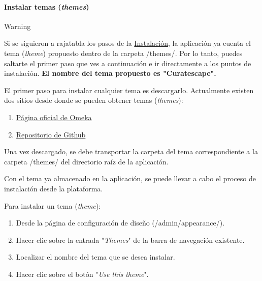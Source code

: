 \documentclass[
]{article}
\providecommand{\tightlist}{%
  \setlength{\itemsep}{0pt}\setlength{\parskip}{0pt}}
\begin{document}
\hypertarget{instalar-temas-themes}{%
\paragraph{\texorpdfstring{Instalar temas
(\emph{themes})}{Instalar temas (themes)}}\label{instalar-temas-themes}}

Warning

Si se siguieron a rajatabla los pasos de la
\protect\hyperlink{instalaciuxf3n}{Instalación}, la aplicación ya cuenta
el tema (\emph{theme}) propuesto dentro de la carpeta {/themes/}. Por lo
tanto, puedes saltarte el primer paso que ves a continuación e ir
directamente a los puntos de instalación. \textbf{El nombre del tema
propuesto es "Curatescape".}

El primer paso para instalar cualquier tema es descargarlo. Actualmente
existen dos sitios desde donde se pueden obtener temas (\emph{themes}):

\begin{enumerate}
\def\labelenumi{\arabic{enumi}.}
\tightlist
\item
  \href{https://omeka.org/classic/themes/}{Página oficial de Omeka}
\item
  \href{https://daniel-km.github.io/UpgradeToOmekaS/omeka_themes.html}{Repositorio
  de Github}
\end{enumerate}

Una vez descargado, se debe transportar la carpeta del tema
correspondiente a la carpeta {/themes/} del directorio raíz de la
aplicación.

Con el tema ya almacenado en la aplicación, se puede llevar a cabo el
proceso de instalación desde la plataforma.

Para instalar un tema (\emph{theme}):

\begin{enumerate}
\def\labelenumi{\arabic{enumi}.}
\tightlist
\item
  Desde la página de configuración de diseño ({/admin/appearance/}).
\item
  Hacer clic sobre la entrada "\emph{Themes}" de la barra de navegación
  existente.
\item
  Localizar el nombre del tema que se desea instalar.
\item
  Hacer clic sobre el botón "\emph{Use this theme}".
\end{enumerate}
\end{document}
